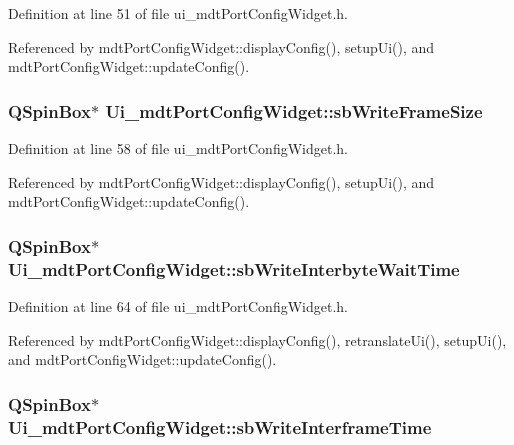 Definition at line 51 of file ui\-\_\-mdt\-Port\-Config\-Widget.\-h.



Referenced by mdt\-Port\-Config\-Widget\-::display\-Config(), setup\-Ui(), and mdt\-Port\-Config\-Widget\-::update\-Config().

\hypertarget{class_ui__mdt_port_config_widget_a52ec537c07730bc8bb402789ccb51774}{
\subsubsection[{sb\-Write\-Frame\-Size}]{\setlength{\rightskip}{0pt plus 5cm}Q\-Spin\-Box$\ast$ Ui\-\_\-mdt\-Port\-Config\-Widget\-::sb\-Write\-Frame\-Size}}\label{class_ui__mdt_port_config_widget_a52ec537c07730bc8bb402789ccb51774}


Definition at line 58 of file ui\-\_\-mdt\-Port\-Config\-Widget.\-h.



Referenced by mdt\-Port\-Config\-Widget\-::display\-Config(), setup\-Ui(), and mdt\-Port\-Config\-Widget\-::update\-Config().

\hypertarget{class_ui__mdt_port_config_widget_af238980e5cedecd8f8c80f75a99f8aab}{
\subsubsection[{sb\-Write\-Interbyte\-Wait\-Time}]{\setlength{\rightskip}{0pt plus 5cm}Q\-Spin\-Box$\ast$ Ui\-\_\-mdt\-Port\-Config\-Widget\-::sb\-Write\-Interbyte\-Wait\-Time}}\label{class_ui__mdt_port_config_widget_af238980e5cedecd8f8c80f75a99f8aab}


Definition at line 64 of file ui\-\_\-mdt\-Port\-Config\-Widget.\-h.



Referenced by mdt\-Port\-Config\-Widget\-::display\-Config(), retranslate\-Ui(), setup\-Ui(), and mdt\-Port\-Config\-Widget\-::update\-Config().

\hypertarget{class_ui__mdt_port_config_widget_afe980ec9ae205856bc2bb476feb91d32}{
\subsubsection[{sb\-Write\-Interframe\-Time}]{\setlength{\rightskip}{0pt plus 5cm}Q\-Spin\-Box$\ast$ Ui\-\_\-mdt\-Port\-Config\-Widget\-::sb\-Write\-Interframe\-Time}}\label{class_ui__mdt_port_config_widget_afe980ec9ae205856bc2bb476feb91d32}



